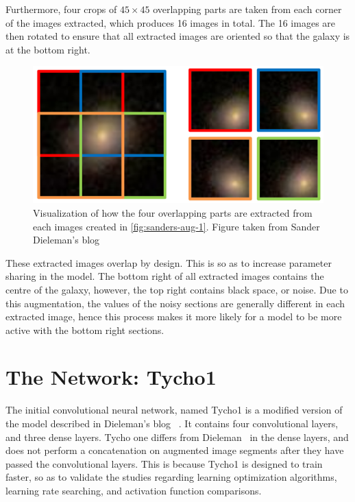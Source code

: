 \documentclass[12pt,a4paper,oneside,oldfontcommands]{memoir}
\begin{document}
Furthermore, four crops of \(45\times45\) overlapping parts are taken from each corner of the images extracted, which produces 16 images in total. The 16 images are then rotated to ensure that all extracted images are oriented so that the galaxy is at the bottom right.


\begin{figure}[H]
  \centering
    \includegraphics[width=\linewidth]{images/sanders-aug-2.png}
    \caption{Visualization of how the four overlapping parts are extracted from each images created in \ref{fig:sanders-aug-1}. Figure taken from Sander Dieleman's blog~\cite{Sanders-GZ}}
    \label{fig:sanders-aug-2}
\end{figure}

These extracted images overlap by design. This is so as to increase parameter sharing in the model. The bottom right of all extracted images contains the centre of the galaxy, however, the top right contains black space, or noise. Due to this augmentation, the values of the noisy sections are generally different in each extracted image, hence this process makes it more likely for a model to be more active with the bottom right sections.

\chapter{The Network: Tycho1}

The initial convolutional neural network, named Tycho1 is a modified version of the model described in Dieleman's blog ~\cite{Sanders-GZ}. It contains four convolutional layers, and three dense layers. Tycho one differs from Dieleman~\cite{Sanders-GZ} in the dense layers, and does not perform a concatenation on augmented image segments after they have passed the convolutional layers. This is because Tycho1 is designed to train faster, so as to validate the studies regarding learning optimization algorithms, learning rate searching, and activation function comparisons. 
\end{document}
